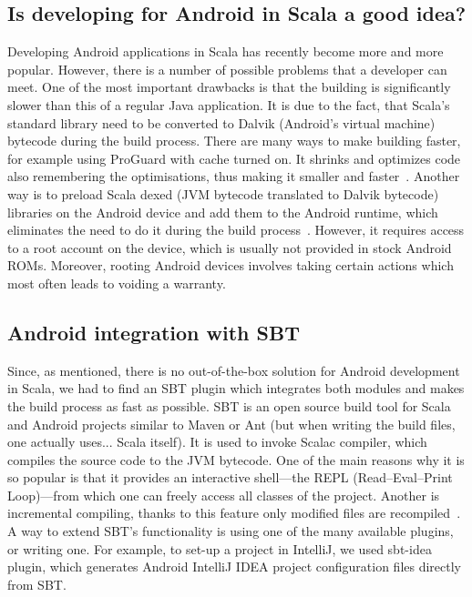 \subsection{Is developing for Android in Scala a good idea?}
\label{subsec:good-idea}
Developing Android applications in Scala has recently become more and more popular. However, there is a number of possible problems that a developer can meet. One of the most important drawbacks is that the building is significantly slower than this of a regular Java application. It is due to the fact, that Scala's standard library need to be converted to Dalvik (Android's virtual machine) bytecode during the build process. There are many ways to make building faster, for example using ProGuard with cache turned on. It shrinks and optimizes code also remembering the optimisations, thus making it smaller and faster~\cite{Berkel:2011:preinstall}. Another way is to preload Scala dexed (JVM bytecode translated to Dalvik bytecode) libraries on the Android device and add them to the Android runtime, which eliminates the need to do it during the build process~\cite{Berkel:2011:preinstall}. However, it requires access to a root account on the device, which is usually not provided in stock Android ROMs. Moreover, rooting Android devices involves taking certain actions which most often leads to voiding a warranty.

\subsection{Android integration with SBT}
\label{subsec:android-sbt}
Since, as mentioned, there is no out-of-the-box solution for Android development in Scala, we had to find an SBT plugin which integrates both modules and makes the build process as fast as possible. SBT is an open source build tool for Scala and Android projects similar to Maven or Ant (but when writing the build files, one actually uses... Scala itself). It is used to invoke Scalac compiler, which compiles the source code to the JVM bytecode. One of the main reasons why it is so popular is that it provides an interactive shell---the REPL (Read--Eval--Print Loop)---from which one can freely access all classes of the project. Another is incremental compiling, thanks to this feature only modified files are recompiled~\cite{Fatin:2012:NewWay}. A way to extend SBT's functionality is using one of the many available plugins, or writing one. For example, to set-up a project in IntelliJ, we used sbt-idea plugin, which generates Android IntelliJ IDEA project configuration files directly from SBT.

